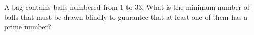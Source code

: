 A bag contains balls numbered from $1$ to $33$. What is the minimum number of balls that must be drawn blindly to guarantee that at least one of them has a prime number?
